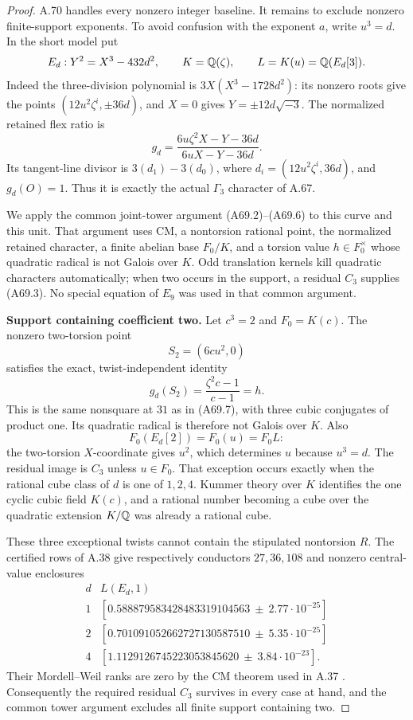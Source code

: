 \begin{proof}
A.70 handles every nonzero integer baseline.
It remains to exclude nonzero finite-support
exponents. To avoid confusion with the exponent
$a$, write $u^3=d$. In the short model put
\[
 E_d:Y^2=X^3-432d^2,\qquad K=\mathbb Q(\zeta),
 \qquad L=K(u)=\mathbb Q(E_d[3]).
\]
Indeed the three-division polynomial is
$3X(X^3-1728d^2)$: its nonzero roots give
the points $(12u^2\zeta^i,\pm36d)$,
and $X=0$ gives $Y=\pm12d\sqrt{-3}$.
The normalized retained flex ratio is
\[
 g_d=\frac{6u\zeta^2X-Y-36d}{6uX-Y-36d}.
 \tag{A71.1}
\]
Its tangent-line divisor is $3(d_1)-3(d_0)$,
where $d_i=(12u^2\zeta^i,36d)$, and
$g_d(O)=1$. Thus it is exactly the actual
$\Gamma_3$ character of A.67.

We apply the common joint-tower argument
(A69.2)--(A69.6) to this curve and this
unit. That argument uses CM, a nontorsion
rational point, the normalized retained
character, a finite abelian base $F_0/K$,
and a torsion value $h\in F_0^\times$
whose quadratic radical is not Galois
over $K$. Odd translation kernels kill
quadratic characters automatically; when
two occurs in the support, a residual
$C_3$ supplies (A69.3). No special
equation of $E_9$ was used in that
common argument.

\par\smallskip\noindent\textbf{Support containing coefficient two.}\enspace
Let $c^3=2$ and $F_0=K(c)$. The
nonzero two-torsion point
\[
 S_2=(6cu^2,0)
\]
satisfies the exact, twist-independent
identity
\[
 g_d(S_2)=\frac{\zeta^2c-1}{c-1}=h.
 \tag{A71.2}
\]
This is the same nonsquare at $31$
as in (A69.7), with three cubic
conjugates of product one. Its
quadratic radical is therefore not
Galois over $K$.
Also
\[
 F_0(E_d[2])=F_0(u)=F_0L:
\]
the two-torsion $X$-coordinate gives
$u^2$, which determines $u$ because
$u^3=d$. The residual image is
$C_3$ unless $u\in F_0$.
That exception occurs exactly when
the rational cube class of $d$
is one of $1,2,4$. Kummer theory
over $K$ identifies the one cyclic
cubic field $K(c)$, and a rational
number becoming a cube over the
quadratic extension $K/\mathbb Q$ was
already a rational cube.

These three exceptional twists
cannot contain the stipulated
nontorsion $R$. The certified
rows of A.38 give respectively
conductors $27,36,108$ and
nonzero central-value enclosures
\[
\begin{array}{c|l}
d&L(E_d,1)\\\hline
1&[0.588879583428483319104563\ \pm\ 2.77\cdot10^{-25}]\\
2&[0.701091052662727130587510\ \pm\ 5.35\cdot10^{-25}]\\
4&[1.1129126745223053845620\ \pm\ 3.84\cdot10^{-23}].
\end{array}
\]
Their Mordell--Weil ranks are zero
by the CM theorem used in A.37
\citep[Corollary C and Remark (3)]{AMRubin1987}.
Consequently the required residual
$C_3$ survives in every case at
hand, and the common tower
argument excludes all finite
support containing two.


\end{proof}
